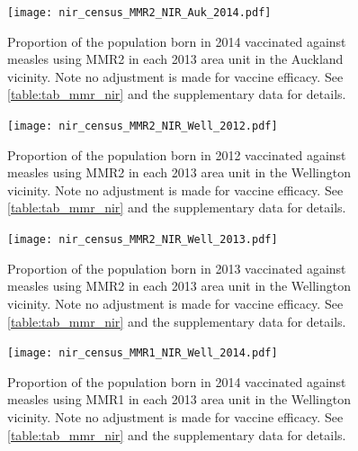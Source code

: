 \documentclass{article}
\begin{document}
\begin{figure}
\begin{center}
    \texttt{[image: nir\_census\_MMR2\_NIR\_Auk\_2014.pdf]}
 \end{center}
    \caption{Proportion of the population born in 2014 vaccinated against measles using MMR2 in each 2013 area unit in the Auckland vicinity. Note no adjustment is made for vaccine efficacy. See \autoref{table:tab_mmr_nir} and the supplementary data for details.}
\label{fig:fig22014_a}
\end{figure}

\begin{figure}
\begin{center}
    \texttt{[image: nir\_census\_MMR2\_NIR\_Well\_2012.pdf]}
 \end{center}
    \caption{Proportion of the population born in 2012 vaccinated against measles using MMR2 in each 2013 area unit in the Wellington vicinity. Note no adjustment is made for vaccine efficacy. See \autoref{table:tab_mmr_nir} and the supplementary data for details.}
\label{fig:fig22012_w}
\end{figure}

\begin{figure}
\begin{center}
    \texttt{[image: nir\_census\_MMR2\_NIR\_Well\_2013.pdf]}
 \end{center}
    \caption{Proportion of the population born in 2013 vaccinated against measles using MMR2 in each 2013 area unit in the Wellington vicinity. Note no adjustment is made for vaccine efficacy. See \autoref{table:tab_mmr_nir} and the supplementary data for details.}
\label{fig:fig22013_w}
\end{figure}


\begin{figure}
\begin{center}
    \texttt{[image: nir\_census\_MMR1\_NIR\_Well\_2014.pdf]}
 \end{center}
    \caption{Proportion of the population born in 2014 vaccinated against measles using MMR1 in each 2013 area unit in the Wellington vicinity. Note no adjustment is made for vaccine efficacy. See \autoref{table:tab_mmr_nir} and the supplementary data for details.}
\label{fig:fig12014_w}
\end{figure}
\end{document}
